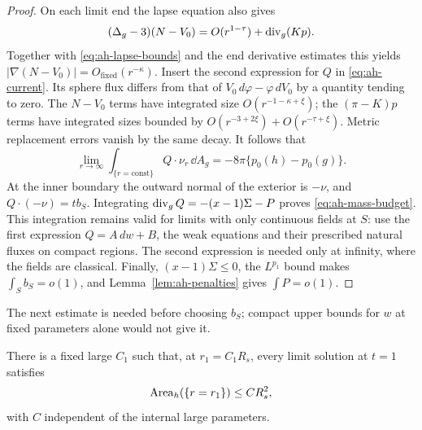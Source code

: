 \begin{proof}
On each limit end the lapse equation also gives
\[
 (\Delta_g-3)(N-V_0)
  =O(r^{1-\tau})+\operatorname{div}_g(Kp).
\]
Together with \eqref{eq:ah-lapse-bounds} and the end
derivative estimates this yields
\(|\nabla(N-V_0)|=O_{\mathrm{fixed}}(r^{-\kappa})\).
Insert the second expression for \(Q\) in
\eqref{eq:ah-current}.  Its sphere flux differs from
that of \(V_0\,d\varphi-\varphi\,dV_0\) by a quantity
tending to zero.  The \(N-V_0\) terms have integrated
size \(O(r^{-1-\kappa+\xi})\); the
\((\pi-K)p\) terms have integrated sizes bounded by
\(O(r^{-3+2\xi})+O(r^{-\tau+\xi})\).
Metric replacement errors vanish by the same decay.
It follows that
\[
 \lim_{r\to\infty}\int_{\{r=\mathrm{const}\}}Q\cdot\nu_r
       \,\dd A_g=-8\pi\{p_0(h)-p_0(g)\}.
\]
At the inner boundary the outward normal of the exterior
is \(-\nu\), and \(Q\cdot(-\nu)=t b_S\).
Integrating \(\operatorname{div}_g Q=-(x-1)\Sigma-P\) proves
\eqref{eq:ah-mass-budget}.  This integration remains valid
for limits with only continuous fields at \(S\): use the
first expression \(Q=A\,dw+B\), the weak equations and
their prescribed natural fluxes on compact regions.
The second expression is needed only at infinity, where
the fields are classical.  Finally,
\((x-1)\Sigma\le0\), the \(L^{p_1}\) bound makes
\(\int_S b_S=o(1)\), and
Lemma~\ref{lem:ah-penalties} gives \(\int P=o(1)\).
\end{proof}

The next estimate is needed before choosing \(b_S\); compact
upper bounds for \(w\) at fixed parameters alone would not
give it.

\begin{lemma}\label{lem:ah-comparison-sphere}
There is a fixed large \(C_1\) such that, at
\(r_1=C_1R_s\), every limit solution at \(t=1\) satisfies
\begin{equation}\label{eq:ah-comparison-area}
 \operatorname{Area}_h(\{r=r_1\})\le C R_s^2,
\end{equation}
with \(C\) independent of the internal large parameters.
\end{lemma}

